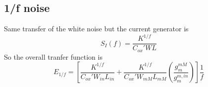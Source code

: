 \subsection{1/f noise}
Same transfer of the white noise but the current generator is 
\begin{equation}
S_I(f)=\frac{K^{1/f}}{C_{ox}'WL}
\end{equation}
So the overall tranfer function is 
\begin{equation}
E_{1/f}=[\frac{K^{1/f}}{C_{ox}'W_{in}L_{in}}+\frac{K^{1/f}}{C_{ox}'W_{mM}L_{mM}}\left(\frac{g_{m}^{mM}}{g_{m}^{m,in}}\right)]\frac{1}{f}
\end{equation}


